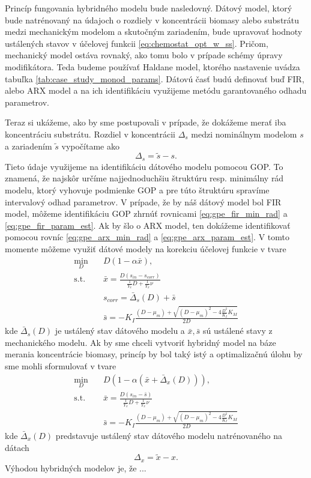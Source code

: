 Princíp fungovania hybridného modelu bude nasledovný. Dátový model, ktorý bude natrénovaný na údajoch o rozdiely v koncentrácii biomasy alebo substrátu medzi mechanickým modelom a skutočným zariadením, bude upravovať hodnoty ustálených stavov v účelovej funkcii \eqref{eq:chemostat_opt_w_ss}. Pričom, mechanický model ostáva rovnaký, ako tomu bolo v prípade schémy úpravy modifikátora. Teda budeme používať Haldane model, ktorého nastavenie uvádza tabuľka \ref{tab:case_study_monod_params}. Dátovú časť budú definovať buď FIR, alebo ARX model a na ich identifikáciu využijeme metódu garantovaného odhadu parametrov. 

Teraz si ukážeme, ako by sme postupovali v prípade, že dokážeme merať iba koncentráciu substrátu. Rozdiel v koncentrácii $ \Delta_{s} $ medzi nominálnym modelom $ s $ a zariadením $ \tilde{s} $ vypočítame ako
\begin{equation}
	\Delta_{s} = \tilde{s} - s.
\end{equation}
Tieto údaje využijeme na identifikáciu dátového modelu pomocou GOP. To znamená, že najskôr určíme najjednoduchšiu štruktúru resp. minimálny rád modelu, ktorý vyhovuje podmienke GOP a pre túto štruktúru spravíme intervalový odhad parametrov. V prípade, že by náš dátový model bol FIR model, môžeme identifikáciu GOP zhrnúť rovnicami \eqref{eq:gpe_fir_min_rad} a \eqref{eq:gpe_fir_param_est}. Ak by šlo o ARX model, ten dokážeme identifikovať pomocou rovníc \eqref{eq:gpe_arx_min_rad} a \eqref{eq:gpe_arx_param_est}. V tomto momente môžeme využiť dátové modely na korekciu účelovej funkcie v tvare
\begin{equation}
	\begin{split}
		\min_{D} &\quad D\left(1-\alpha\bar{x}\right), \\
		\text{s.t.} &\quad \bar{x} = \frac{D\left(s_{in}-s_{corr}\right)}{\frac{1}{Y_{x}}D + \frac{1}{Y_{x}}\nu} \\
		&\quad s_{corr} = \bar{\Delta}_{s}(D) + \bar{s}\\
		&\quad \bar{s} = -K_{I}\frac{\left(D-\mu_{m}\right) + \sqrt{\left(D-\mu_{m}\right)^2 - 4\frac{D^2}{K_{I}}K_{M}}}{2D}
	\end{split}
\end{equation}
kde $ \bar{\Delta}_{s}(D) $ je ustálený stav dátového modelu a $ \bar{x}, \bar{s} $ sú ustálené stavy z mechanického modelu. Ak by sme chceli vytvoriť hybridný model na báze merania koncentrácie biomasy, princíp by bol taký istý a optimalizačnú úlohu by sme mohli sformulovať v tvare
\begin{equation}
	\begin{split}
		\min_{D} &\quad D\left(1-\alpha\left(\bar{x}+\bar{\Delta}_{x}(D)\right)\right), \\
		\text{s.t.} &\quad \bar{x} = \frac{D\left(s_{in}-\bar{s}\right)}{\frac{1}{Y_{x}}D + \frac{1}{Y_{x}}\nu} \\
		&\quad \bar{s} = -K_{I}\frac{\left(D-\mu_{m}\right) + \sqrt{\left(D-\mu_{m}\right)^2 - 4\frac{D^2}{K_{I}}K_{M}}}{2D}
	\end{split}
\end{equation}
kde $ \bar{\Delta}_{x}(D) $ predstavuje ustálený stav dátového modelu natrénovaného na dátach 
\begin{equation}
	\Delta_{x} = \tilde{x} - x.
\end{equation}
Výhodou hybridných modelov je, že ...